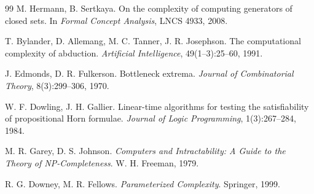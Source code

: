\documentclass[11pt]{article}
\begin{document}
\begin{thebibliography}{99}
M. Hermann, B. Sertkaya.
\newblock On the complexity of computing generators of closed sets.
\newblock In \emph{Formal Concept Analysis}, LNCS 4933, 2008.

T. Bylander, D. Allemang, M. C. Tanner, J. R. Josephson.
\newblock The computational complexity of abduction.
\newblock \emph{Artificial Intelligence}, 49(1--3):25--60, 1991.

J. Edmonds, D. R. Fulkerson.
\newblock Bottleneck extrema.
\newblock \emph{Journal of Combinatorial Theory}, 8(3):299--306, 1970.

W. F. Dowling, J. H. Gallier.
\newblock Linear-time algorithms for testing the satisfiability of propositional Horn formulae.
\newblock \emph{Journal of Logic Programming}, 1(3):267--284, 1984.

M. R. Garey, D. S. Johnson.
\newblock \emph{Computers and Intractability: A Guide to the Theory of NP-Completeness}.
\newblock W. H. Freeman, 1979.

R. G. Downey, M. R. Fellows.
\newblock \emph{Parameterized Complexity}.
\newblock Springer, 1999.

\end{thebibliography}
\end{document}
